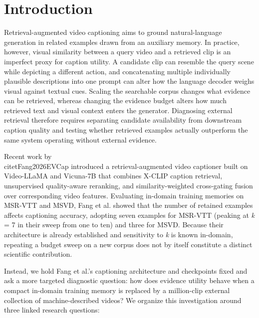 \documentclass[11pt,a4paper]{article}
\begin{document}
\section{Introduction}
Retrieval-augmented video captioning aims to ground natural-language generation in related examples drawn from an auxiliary memory. In practice, however, visual similarity between a query video and a retrieved clip is an imperfect proxy for caption utility. A candidate clip can resemble the query scene while depicting a different action, and concatenating multiple individually plausible descriptions into one prompt can alter how the language decoder weighs visual against textual cues. Scaling the searchable corpus changes what evidence can be retrieved, whereas changing the evidence budget alters how much retrieved text and visual context enters the generator. Diagnosing external retrieval therefore requires separating candidate availability from downstream caption quality and testing whether retrieved examples actually outperform the same system operating without external evidence.

Recent work by \\citet{Fang2026EVCap} introduced a retrieval-augmented video captioner built on Video-LLaMA and Vicuna-7B that combines X-CLIP caption retrieval, unsupervised quality-aware reranking, and similarity-weighted cross-gating fusion over corresponding video features. Evaluating in-domain training memories on MSR-VTT and MSVD, Fang et al. showed that the number of retained examples affects captioning accuracy, adopting seven examples for MSR-VTT (peaking at \emph{k} = 7 in their sweep from one to ten) and three for MSVD. Because their architecture is already established and sensitivity to \emph{k} is known in-domain, repeating a budget sweep on a new corpus does not by itself constitute a distinct scientific contribution.

Instead, we hold Fang et al.'s captioning architecture and checkpoints fixed and ask a more targeted diagnostic question: how does evidence utility behave when a compact in-domain training memory is replaced by a million-clip external collection of machine-described videos? We organize this investigation around three linked research questions:
\end{document}
